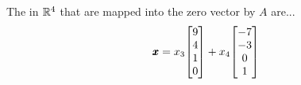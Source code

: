 \documentclass{../mathhomework}
\newenvironment{Mat}{\begin{bmatrix}}{\end{bmatrix}}
\begin{document}
\begin{problem}[1.8\#9]
\begin{solution}
        The  in $\mathbb{R}^4$ that are mapped into the zero vector by $A$ are...
        \begin{equation*}
            \Vect{x} = x_3\begin{Mat}
                9 \\ 4 \\ 1 \\ 0
            \end{Mat} + x_4\begin{Mat}
                -7 \\ -3 \\ 0 \\ 1
            \end{Mat}
        \end{equation*}
    \end{solution}
\end{problem}

\newpage
\end{document}
